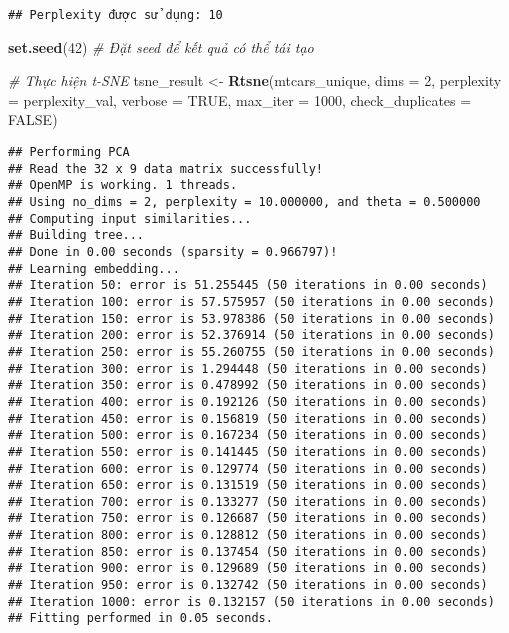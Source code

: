 \documentclass[
]{article}
\newenvironment{Shaded}{\begin{snugshade}}{\end{snugshade}}
\newcommand{\AttributeTok}[1]{\textcolor[rgb]{0.13,0.29,0.53}{#1}}
\newcommand{\CommentTok}[1]{\textcolor[rgb]{0.56,0.35,0.01}{\textit{#1}}}
\newcommand{\ConstantTok}[1]{\textcolor[rgb]{0.56,0.35,0.01}{#1}}
\newcommand{\DecValTok}[1]{\textcolor[rgb]{0.00,0.00,0.81}{#1}}
\newcommand{\FunctionTok}[1]{\textcolor[rgb]{0.13,0.29,0.53}{\textbf{#1}}}
\newcommand{\NormalTok}[1]{#1}
\newcommand{\OtherTok}[1]{\textcolor[rgb]{0.56,0.35,0.01}{#1}}
\begin{document}
\begin{verbatim}
## Perplexity được sử dụng: 10
\end{verbatim}

\begin{Shaded}
\begin{Highlighting}[]
\FunctionTok{set.seed}\NormalTok{(}\DecValTok{42}\NormalTok{) }\CommentTok{\# Đặt seed để kết quả có thể tái tạo}

\CommentTok{\# Thực hiện t{-}SNE}
\NormalTok{tsne\_result }\OtherTok{\textless{}{-}} \FunctionTok{Rtsne}\NormalTok{(mtcars\_unique, }\AttributeTok{dims =} \DecValTok{2}\NormalTok{, }\AttributeTok{perplexity =}\NormalTok{ perplexity\_val, }
                     \AttributeTok{verbose =} \ConstantTok{TRUE}\NormalTok{, }\AttributeTok{max\_iter =} \DecValTok{1000}\NormalTok{, }\AttributeTok{check\_duplicates =} \ConstantTok{FALSE}\NormalTok{)}
\end{Highlighting}
\end{Shaded}

\begin{verbatim}
## Performing PCA
## Read the 32 x 9 data matrix successfully!
## OpenMP is working. 1 threads.
## Using no_dims = 2, perplexity = 10.000000, and theta = 0.500000
## Computing input similarities...
## Building tree...
## Done in 0.00 seconds (sparsity = 0.966797)!
## Learning embedding...
## Iteration 50: error is 51.255445 (50 iterations in 0.00 seconds)
## Iteration 100: error is 57.575957 (50 iterations in 0.00 seconds)
## Iteration 150: error is 53.978386 (50 iterations in 0.00 seconds)
## Iteration 200: error is 52.376914 (50 iterations in 0.00 seconds)
## Iteration 250: error is 55.260755 (50 iterations in 0.00 seconds)
## Iteration 300: error is 1.294448 (50 iterations in 0.00 seconds)
## Iteration 350: error is 0.478992 (50 iterations in 0.00 seconds)
## Iteration 400: error is 0.192126 (50 iterations in 0.00 seconds)
## Iteration 450: error is 0.156819 (50 iterations in 0.00 seconds)
## Iteration 500: error is 0.167234 (50 iterations in 0.00 seconds)
## Iteration 550: error is 0.141445 (50 iterations in 0.00 seconds)
## Iteration 600: error is 0.129774 (50 iterations in 0.00 seconds)
## Iteration 650: error is 0.131519 (50 iterations in 0.00 seconds)
## Iteration 700: error is 0.133277 (50 iterations in 0.00 seconds)
## Iteration 750: error is 0.126687 (50 iterations in 0.00 seconds)
## Iteration 800: error is 0.128812 (50 iterations in 0.00 seconds)
## Iteration 850: error is 0.137454 (50 iterations in 0.00 seconds)
## Iteration 900: error is 0.129689 (50 iterations in 0.00 seconds)
## Iteration 950: error is 0.132742 (50 iterations in 0.00 seconds)
## Iteration 1000: error is 0.132157 (50 iterations in 0.00 seconds)
## Fitting performed in 0.05 seconds.
\end{verbatim}
\end{document}
